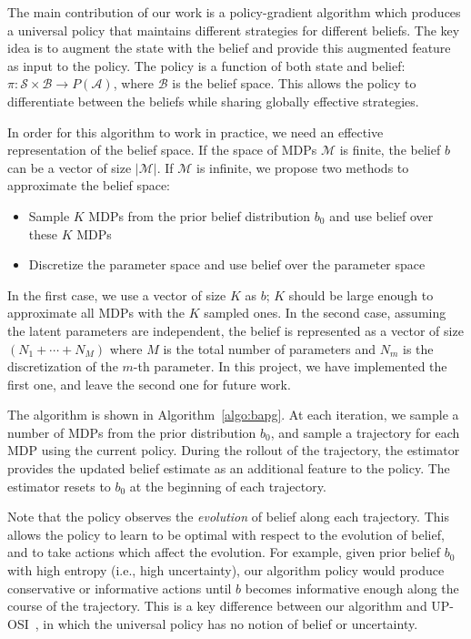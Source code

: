 \documentclass{article}
\newcommand{\aref}[1]{Algorithm~\ref{#1}}%
\begin{document}
The main contribution of our work is a policy-gradient algorithm which produces a universal policy that maintains different strategies for different beliefs. The key idea is to augment the state with the belief and provide this augmented feature as input to the policy. The policy is a function of both state and belief: $\pi: \mathcal{S} \times \mathcal{B} \rightarrow P(\mathcal{A})$, where $\mathcal{B}$ is the belief space. This allows the policy to differentiate between the beliefs while sharing globally effective strategies.

In order for this algorithm to work in practice, we need an effective representation of the belief space. If the space of MDPs $\mathcal{M}$ is finite, the belief $b$ can be a vector of size $|\mathcal{M}|$. If $\mathcal{M}$ is infinite, we propose two methods to approximate the belief space:

\begin{itemize}
    \item Sample $K$ MDPs from the prior belief distribution $b_0$ and use belief over these $K$ MDPs
    \item Discretize the parameter space and use belief over the parameter space
\end{itemize}
In the first case, we use a vector of size $K$ as $b$; $K$ should be large enough to approximate all MDPs with the $K$ sampled ones. In the second case, assuming the latent parameters are independent, the belief is represented as a vector of size $(N_1 + \cdots + N_M)$ where $M$ is the total number of parameters and $N_m$ is the discretization of the $m$-th parameter. In this project, we have implemented the first one, and leave the second one for future work.

The algorithm is shown in \aref{algo:bapg}. At each iteration, we sample a number of MDPs from the prior distribution $b_0$, and sample a trajectory for each MDP using the current policy. During the rollout of the trajectory, the estimator provides the updated belief estimate as an additional feature to the policy. The estimator resets to $b_0$ at the beginning of each trajectory.

Note that the policy observes the \emph{evolution} of belief along each trajectory. This allows the policy to learn to be optimal with respect to the evolution of belief, and to take actions which affect the evolution. For example, given prior belief $b_0$ with high entropy (i.e., high uncertainty), our algorithm policy would produce conservative or informative actions until $b$ becomes informative enough along the course of the trajectory. This is a key difference between our algorithm and UP-OSI~\cite{yu2017uposi}, in which the universal policy has no notion of belief or uncertainty.
\end{document}
